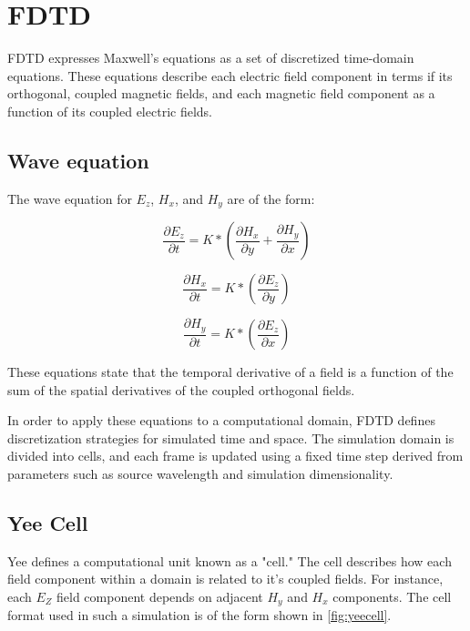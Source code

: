 
\chapter{FDTD} \label{ch:fdtd}


FDTD expresses Maxwell's equations as a set of discretized time-domain equations\cite{Yee}. These equations describe each electric field component in terms if its orthogonal, coupled magnetic fields, and each magnetic field component as a function of its coupled electric fields.


\section{Wave equation}

The wave equation for  $E_z$, $H_x$, and $H_y$ are of the form:

\begin{equation} \label{eq:waveequation} 
\frac{\partial E_z}{\partial t} = K * (\frac{\partial H_x}{\partial y} + \frac{\partial H_y}{\partial x})
\end{equation}

\begin{equation}
\frac{\partial H_x}{\partial t} = K * (\frac{\partial E_z}{\partial y})
\end{equation}

\begin{equation}
\frac{\partial H_y}{\partial t} = K * (\frac{\partial E_z}{\partial x})
\end{equation}

These equations state that the temporal derivative of a field is a function of the sum of the spatial derivatives of the coupled orthogonal fields.

In order to apply these equations to a computational domain, FDTD defines discretization strategies for simulated time and space. The simulation domain is divided into cells, and each frame is updated using a fixed time step derived from parameters such as source wavelength and simulation dimensionality.

\section{Yee Cell}

Yee \cite{Yee} defines a computational unit known as a "cell." The cell describes how each field component within a domain is related to it's coupled fields. For instance, each $E_Z$ field component depends on adjacent $H_y$ and $H_x$ components. The cell format used in such a simulation is of the form shown in \autoref{fig:yeecell}.

